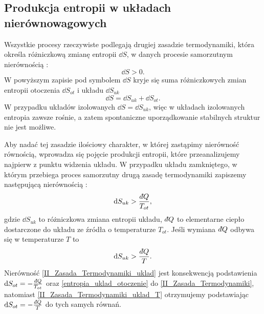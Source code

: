 \documentclass[10pt, a4paper, twoside, onecolumn]{article}
\numberwithin{equation}{section}
\newcommand{\dbar}{d\hspace*{-0.08em}\bar{}\hspace*{0.1em}}
\begin{document}
	\subsection{Produkcja entropii w układach nierównowagowych}
	Wszystkie procesy rzeczywiste podlegają drugiej zasadzie termodynamiki, która określa różniczkową zmianę entropii \(\dd{S}\), w danych procesie samorzutnym nierównością \cite{buchowski}:
	\begin{equation}\label{II_Zasada_Termodynamiki}
		\dd{S}>0.
	\end{equation}
	W powyższym zapisie pod symbolem \(\dd{S}\) kryje się suma różniczkowych zmian entropii otoczenia \(\dd{S_{ot}}\) i układu \(\dd{S_{uk}}\)
	\begin{equation}\label{entropia_uklad_otoczenie}
		\dd{S}=\dd{S_{uk}}+\dd{S_{ot}}.
	\end{equation}
	W przypadku układów izolowanych \(\dd{S}=\dd{S_{uk}}\), 
	więc w układach izolowanych entropia zawsze rośnie, a zatem spontaniczne uporządkowanie stabilnych struktur nie jest możliwe. \par
	Aby nadać tej zasadzie ilościowy charakter, w której zastąpimy nierówność równością, wprowadza się pojęcie produkcji entropii, które przeanalizujemy najpierw z punktu widzenia układu. W przypadku układu zamkniętego, w którym przebiega proces samorzutny drugą zasadę termodynamiki zapiszemy następującą nierównością \cite{orlik, pigon1, jaworski}: 
	\begin{equation}\label{II_Zasada_Termodynamiki_uklad}
		\dd{S_{uk}}>\frac{\dbar Q}{T_{ot}},
	\end{equation}
	gdzie \(\dd{S_{uk}}\) to różniczkowa zmiana entropii układu, \(\dbar Q\) to elementarne ciepło dostarczone do układu ze źródła o temperaturze \(T_{ot}\). Jeśli wymiana \(\dbar Q\) odbywa się w temperaturze \(T\) to 
	\begin{equation}\label{II_Zasada_Termodynamiki_uklad_T}
		\dd{S_{uk}}>\frac{\dbar Q}{T}.
	\end{equation}
	Nierówność \eqref{II_Zasada_Termodynamiki_uklad} jest konsekwencją podstawienia \(\dd{S_{ot}}=-\frac{\dbar Q}{T_{ot}}\) oraz \eqref{entropia_uklad_otoczenie} do \eqref{II_Zasada_Termodynamiki}, natomiast \eqref{II_Zasada_Termodynamiki_uklad_T} otrzymujemy podstawiając \(\dd{S_{ot}}=-\frac{\dbar Q}{T}\) do tych samych równań. \par
\end{document}
